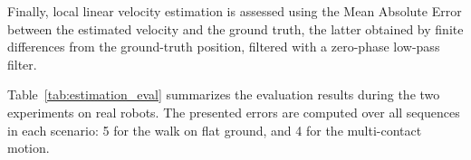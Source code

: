 \documentclass{IJCAS}
\begin{document}
Finally, local linear velocity estimation is assessed using the Mean Absolute Error between the estimated velocity and the ground truth, the latter obtained by finite differences from the ground-truth position, filtered with a zero-phase low-pass filter.

Table~\ref{tab:estimation_eval} summarizes the evaluation results during the two experiments on real robots. The presented errors are computed over all sequences in each scenario: 5 for the walk on flat ground, and 4 for the multi-contact motion.


\end{document}

